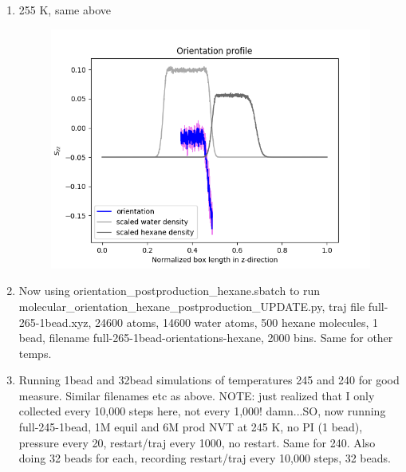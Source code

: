 \documentclass[12pt,reqno]{amsart}
\numberwithin{equation}{section}
\begin{document}
\begin{enumerate}
\item 255 K, same above 

\begin{figure}[H]
\centering
\includegraphics[scale=0.6]{full-255-1bead-orientations-water}
\end{figure}

\item Now using orientation\_postproduction\_hexane.sbatch to run molecular\_orientation\_hexane\_postproduction\_UPDATE.py, traj file full-265-1bead.xyz, 24600 atoms, 14600 water atoms, 500 hexane molecules, 1 bead, filename full-265-1bead-orientations-hexane, 2000 bins. Same for other temps.  

\item Running 1bead and 32bead simulations of temperatures 245 and 240 for good measure.  Similar filenames etc as above.  NOTE: just realized that I only collected every 10,000 steps here, not every 1,000! damn...SO, now running full-245-1bead, 1M equil and 6M prod NVT at 245 K, no PI (1 bead), pressure every 20, restart/traj every 1000, no restart.  Same for 240.  Also doing 32 beads for each, recording restart/traj every 10,000 steps, 32 beads.  


\end{enumerate}
\end{document}
